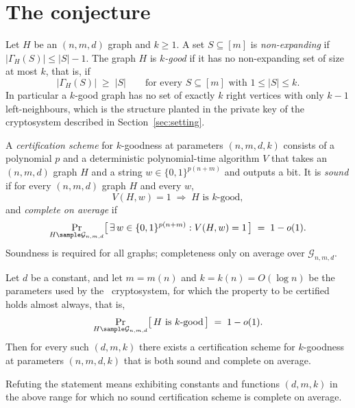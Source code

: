 \documentclass{conjura-conjecture}
\newcommand{\bits}{\{0,1\}}
\newcommand{\Gnmd}{\mathcal{G}_{n,m,d}}
\newcommand{\Nbr}{\Gamma_H}
\begin{document}
\section{The conjecture}\label{sec:conjectures}

\begin{definition}\label{def:kgood}
Let $H$ be an $(n,m,d)$ graph and $k \ge 1$. A set $S \subseteq [m]$ is
\emph{non-expanding} if $|\Nbr(S)| \le |S| - 1$. The graph $H$ is
\emph{$k$-good} if it has no non-expanding set of size at most $k$,
that is, if
\[
  |\Nbr(S)| \;\ge\; |S| \qquad \text{for every } S \subseteq [m]
  \text{ with } 1 \le |S| \le k .
\]
In particular a $k$-good graph has no set of exactly $k$ right vertices
with only $k-1$ left-neighbours, which is the structure planted in the
private key of the cryptosystem described in
Section~\ref{sec:setting}.
\end{definition}

\begin{definition}\label{def:cert}
A \emph{certification scheme} for $k$-goodness at parameters
$(n,m,d,k)$ consists of a polynomial $p$ and a deterministic
polynomial-time algorithm $V$ that takes an $(n,m,d)$ graph $H$ and a
string $w \in \bits^{p(n+m)}$ and outputs a bit. It is \emph{sound} if
for every $(n,m,d)$ graph $H$ and every $w$,
\[
  V(H,w) = 1 \;\Longrightarrow\; H \text{ is } k\text{-good},
\]
and \emph{complete on average} if
\[
  \Pr_{H \sample \Gnmd}
  \bigl[\, \exists\, w \in \bits^{p(n+m)} : V(H,w) = 1 \,\bigr]
  \;=\; 1 - o(1).
\]
Soundness is required for all graphs; completeness only on average over
$\Gnmd$.
\end{definition}

\begin{conjecture}\label{conj:main}
Let $d$ be a constant, and let $m = m(n)$ and $k = k(n) = O(\log n)$ be
the parameters used by the~\cite{ABW10} cryptosystem, for which the
property to be certified holds almost always, that is,
\[
  \Pr_{H \sample \Gnmd}
  \bigl[\, H \text{ is } k\text{-good} \,\bigr] \;=\; 1 - o(1).
\]
Then for every such $(d,m,k)$ there exists a certification scheme for
$k$-goodness at parameters $(n,m,d,k)$ that is both sound and complete
on average.

Refuting the statement means exhibiting constants and functions
$(d,m,k)$ in the above range for which no sound certification scheme is
complete on average.
\end{conjecture}
\end{document}
